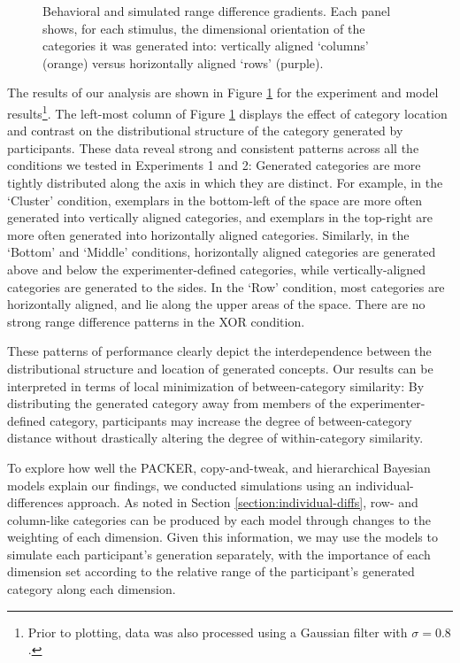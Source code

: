 \documentclass[12pt]{article}
\newcommand\inputpgf[2]{{
\let\pgfimageWithoutPath\pgfimage
\renewcommand{\pgfimage}[2][]{\pgfimageWithoutPath[##1]{#1/##2}}

}}
\begin{document}
\begin{flushleft}
\begin{figure}[p]
    \begin{center}
    \inputpgf{figs/}{range-diff-gradients.pgf}
    \caption{Behavioral and simulated range difference gradients. Each panel shows, for each stimulus, the dimensional orientation of the categories it was generated into: vertically aligned `columns' (orange) versus horizontally aligned `rows' (purple).}
    \label{fig:range-diff-gradients}
    \end{center}
\end{figure}

The results of our analysis are shown in Figure \ref{fig:range-diff-gradients} for the experiment and model results\footnote{Prior to plotting, data was also processed using a Gaussian filter with $\sigma = 0.8$.}. The left-most column of Figure \ref{fig:range-diff-gradients} displays the effect of category location and contrast on the distributional structure of the category generated by participants. These data reveal strong and consistent patterns across all the conditions we tested in Experiments 1 and 2: Generated categories are more tightly distributed along the axis in which they are distinct. For example, in the `Cluster' condition, exemplars in the bottom-left of the space are more often generated into vertically aligned categories, and exemplars in the top-right are more often generated into horizontally aligned categories. Similarly, in the `Bottom' and `Middle' conditions, horizontally aligned categories are generated above and below the experimenter-defined categories, while vertically-aligned categories are generated to the sides. In the `Row' condition, most categories are horizontally aligned, and lie along the upper areas of the space. There are no strong range difference patterns in the XOR condition.

These patterns of performance clearly depict the interdependence between the distributional structure and location of generated concepts. Our results can be interpreted in terms of local minimization of between-category similarity: By distributing the generated category away from members of the experimenter-defined category, participants may increase the degree of between-category distance without drastically altering the degree of within-category similarity.

To explore how well the PACKER, copy-and-tweak, and hierarchical Bayesian models explain our findings, we conducted simulations using an individual-differences approach. As noted in Section \ref{section:individual-diffs}, row- and column-like categories can be produced by each model through changes to the weighting of each dimension. Given this information, we may use the models to simulate each participant's generation separately, with the importance of each dimension set according to the relative range of the participant's generated category along each dimension. 


\end{flushleft}
\end{document}
